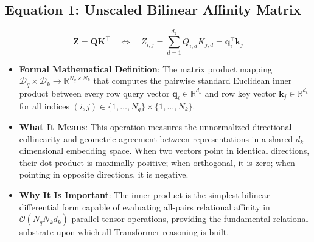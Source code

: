 \documentclass[11pt,a4paper]{article}
\theoremstyle{definition}
\begin{document}
\subsection{\textbf{Equation 1: Unscaled Bilinear Affinity Matrix}}
{\boldmath
\begin{equation}
\mathbf{Z} = \mathbf{Q}\mathbf{K}^\top \quad \Longleftrightarrow \quad Z_{i, j} = \sum_{d=1}^{d_k} Q_{i, d} K_{j, d} = \mathbf{q}_i^\top \mathbf{k}_j
\end{equation}
}
\begin{itemize}
    \item \textbf{Formal Mathematical Definition}:
    The matrix product mapping $\boldsymbol{\mathcal{D}}_q \times \boldsymbol{\mathcal{D}}_k \to \mathbb{R}^{N_q \times N_k}$ that computes the pairwise standard Euclidean inner product between every row query vector $\mathbf{q}_i \in \mathbb{R}^{d_k}$ and row key vector $\mathbf{k}_j \in \mathbb{R}^{d_k}$ for all indices $(i, j) \in \{1, \dots, N_q\} \times \{1, \dots, N_k\}$.
    \item \textbf{What It Means}:
    This operation measures the unnormalized directional collinearity and geometric agreement between representations in a shared $d_k$-dimensional embedding space. When two vectors point in identical directions, their dot product is maximally positive; when orthogonal, it is zero; when pointing in opposite directions, it is negative.
    \item \textbf{Why It Is Important}:
    The inner product is the simplest bilinear differential form capable of evaluating all-pairs relational affinity in $\mathcal{O}(N_q N_k d_k)$ parallel tensor operations, providing the fundamental relational substrate upon which all Transformer reasoning is built.
\end{itemize}
\end{document}
